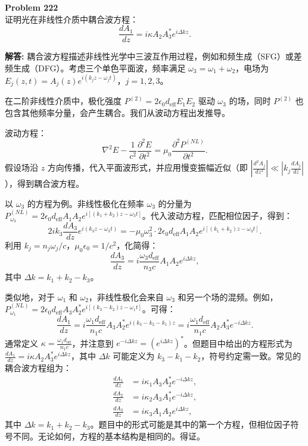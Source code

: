 \documentclass[12pt, a4paper, oneside]{ctexart}
\newenvironment{solution}{\par\noindent\textbf{解答:}\quad}{\par}
\begin{document}
\begin{mdframed}[backgroundcolor=gray!10, linewidth=0pt]
    \textbf{Problem 222} \\
    证明光在非线性介质中耦合波方程：
    \[
    \frac{d A_1}{d z} = i \kappa A_2 A_3^* e^{i \Delta k z}.
    \]
\end{mdframed}
\begin{solution}
    耦合波方程描述非线性光学中三波互作用过程，例如和频生成（SFG）或差频生成（DFG）。考虑三个单色平面波，频率满足 $\omega_3 = \omega_1 + \omega_2$，电场为 $E_j(z,t) = A_j(z) e^{i(k_j z - \omega_j t)}$，$j=1,2,3$。

    在二阶非线性介质中，极化强度 $P^{(2)} = 2\epsilon_0 d_{\text{eff}} E_1 E_2$ 驱动 $\omega_3$ 的场，同时 $P^{(2)}$ 也包含其他频率分量，会产生耦合。我们从波动方程出发推导。

    波动方程：
    \[
    \nabla^2 E - \frac{1}{c^2} \frac{\partial^2 E}{\partial t^2} = \mu_0 \frac{\partial^2 P^{(NL)}}{\partial t^2}.
    \]
    假设场沿 $z$ 方向传播，代入平面波形式，并应用慢变振幅近似（即 $\left| \frac{d^2 A_j}{dz^2} \right| \ll \left| k_j \frac{d A_j}{dz} \right|$），得到耦合波方程。

    以 $\omega_3$ 的方程为例。非线性极化在频率 $\omega_3$ 的分量为 $P^{(NL)}_{\omega_3} = 2\epsilon_0 d_{\text{eff}} A_1 A_2 e^{i[(k_1+k_2)z - \omega_3 t]}$。代入波动方程，匹配相位因子，得到：
    \[
    2i k_3 \frac{d A_3}{d z} e^{i(k_3 z - \omega_3 t)} = -\mu_0 \omega_3^2 \cdot 2\epsilon_0 d_{\text{eff}} A_1 A_2 e^{i[(k_1+k_2)z - \omega_3 t]}.
    \]
    利用 $k_j = n_j \omega_j / c$，$\mu_0 \epsilon_0 = 1/c^2$，化简得：
    \[
    \frac{d A_3}{d z} = i \frac{\omega_3 d_{\text{eff}}}{n_3 c} A_1 A_2 e^{i \Delta k z},
    \]
    其中 $\Delta k = k_1 + k_2 - k_3$。

    类似地，对于 $\omega_1$ 和 $\omega_2$，非线性极化会来自 $\omega_3$ 和另一个场的混频。例如，$P^{(NL)}_{\omega_1} = 2\epsilon_0 d_{\text{eff}} A_3 A_2^* e^{i[(k_3 - k_2)z - \omega_1 t]}$。可得：
    \[
    \frac{d A_1}{d z} = i \frac{\omega_1 d_{\text{eff}}}{n_1 c} A_3 A_2^* e^{i (k_3 - k_2 - k_1) z} = i \frac{\omega_1 d_{\text{eff}}}{n_1 c} A_2 A_3^* e^{-i \Delta k z}.
    \]
    通常定义 $\kappa = \frac{\omega_1 d_{\text{eff}}}{n_1 c}$，并注意到 $e^{-i \Delta k z} = (e^{i \Delta k z})^*$。但题目中给出的方程形式为 $\frac{d A_1}{d z} = i \kappa A_2 A_3^* e^{i \Delta k z}$，其中 $\Delta k$ 可能定义为 $k_3 - k_1 - k_2$，符号约定需一致。常见的耦合波方程组为：
    \begin{align*}
        \frac{d A_1}{d z} &= i \kappa_1 A_3 A_2^* e^{-i \Delta k z}, \\
        \frac{d A_2}{d z} &= i \kappa_2 A_3 A_1^* e^{-i \Delta k z}, \\
        \frac{d A_3}{d z} &= i \kappa_3 A_1 A_2 e^{i \Delta k z},
    \end{align*}
    其中 $\Delta k = k_1 + k_2 - k_3$。题目中的形式可能是其中的第一个方程，但相位因子符号不同。无论如何，方程的基本结构是相同的。得证。
\end{solution}
\end{document}

